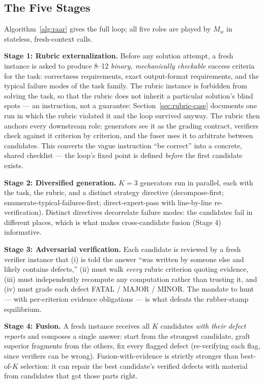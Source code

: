 \documentclass[journal]{IEEEtran}
\begin{document}
\subsection{The Five Stages}
\label{sec:stages}
Algorithm~\ref{alg:raar} gives the full loop; all five roles are played by
$M_w$ in stateless, fresh-context calls.

\textbf{Stage 1: Rubric externalization.} Before any solution attempt, a
fresh instance is asked to produce 8--12 \emph{binary, mechanically
checkable} success criteria for the task: correctness requirements, exact
output-format requirements, and the typical failure modes of the task
family. The rubric instance is forbidden from solving the task, so that
the rubric does not inherit a particular solution's blind spots --- an
instruction, not a guarantee: Section~\ref{sec:rubric-case} documents one
run in which the rubric violated it and the loop survived anyway. The
rubric then
anchors every downstream role: generators see it as the grading contract,
verifiers check against it criterion by criterion, and the fuser uses it to
arbitrate between candidates. This converts the vague instruction
``be correct'' into a concrete, shared checklist --- the loop's fixed point
is defined \emph{before} the first candidate exists.

\textbf{Stage 2: Diversified generation.} $K{=}3$ generators run in
parallel, each with the task, the rubric, and a distinct strategy directive
(decompose-first; enumerate-typical-failures-first; direct-expert-pass with
line-by-line re-verification). Distinct directives decorrelate failure
modes: the candidates fail in different places, which is what makes
cross-candidate fusion (Stage 4) informative.

\textbf{Stage 3: Adversarial verification.} Each candidate is reviewed by a
fresh verifier instance that (i) is told the answer ``was written by someone
else and likely contains defects,'' (ii) must walk \emph{every} rubric
criterion quoting evidence, (iii) must independently recompute any
computation rather than trusting it, and (iv) must grade each defect FATAL /
MAJOR / MINOR. The mandate to hunt --- with per-criterion evidence
obligations --- is what defeats the rubber-stamp equilibrium.

\textbf{Stage 4: Fusion.} A fresh instance receives all $K$ candidates
\emph{with their defect reports} and composes a single answer: start from
the strongest candidate, graft superior fragments from the others, fix every
flagged defect (re-verifying each flag, since verifiers can be wrong).
Fusion-with-evidence is strictly stronger than best-of-$K$ selection: it can
repair the best candidate's verified defects with material from candidates
that got those parts right.
\end{document}
